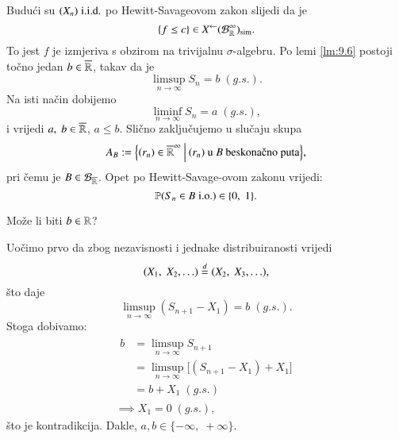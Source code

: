\begin{pr}
    Budu\' ci su $(X_n) \; \mathrm{i.i.d.}$ po Hewitt-Savageovom zakon slijedi da je
    \begin{equation*}
        \{f \leq c\} \in {X}^{\leftarrow} (\mathcal{B}_{\mathbb{R}}^\infty)_{\mathrm{sim}}.
    \end{equation*}
    To jest $f$ je izmjeriva s obzirom na trivijalnu $\sigma$-algebru.
    Po lemi \ref{lm:9.6} postoji to\v cno jedan $b \in \overline{\mathbb{R}}$, takav da je
    \begin{equation*}
        \limsup\limits_{n \to \infty} S_n = b \; (g.s.).
    \end{equation*}
    Na isti na\v cin dobijemo
    \begin{equation*}
        \liminf\limits_{n \to \infty} S_n = a \; (g.s.),
    \end{equation*}
    i vrijedi $a, \; b \in \overline{\mathbb{R}}$, $a \leq b$.
    Sli\v cno zaklju\v cujemo u slu\v caju skupa
    \begin{equation*}
        A_B := \bigSkup{(r_n) \in \extReal^\infty}{(r_n) \textnormal{ u $B$ beskona\v cno puta}},
    \end{equation*}
    pri \v cemu je $B \in \mathcal{B}_{\overline{\mathbb{R}}}$.
    Opet po Hewitt-Savage-ovom zakonu vrijedi:
    \begin{equation*}
        \mathbb{P}({S_n \in B \; \mathrm{i.o.}}) \in \{0, \; 1\}.
    \end{equation*}

    Mo\v ze li biti $b \in \mathbb{R}$?

    Uo\v cimo prvo da zbog nezavisnosti i jednake distribuiranosti vrijedi
    \begin{equation*}
        (X_1, \; X_2, \ldots) \overset{d}{=} (X_2, \; X_3, \ldots),
    \end{equation*}
    \v sto daje 
    \begin{equation*}
        \limsup\limits_{n \to \infty} (S_{n + 1} - X_1) = b \; (g.s.).
    \end{equation*}
    Stoga dobivamo:
    \begin{equation*}
        \begin{gathered}
            \begin{aligned}
                b &= \limsup\limits_{n \to \infty} S_{n + 1}\\
                &= \limsup\limits_{n \to \infty} \big[ (S_{n + 1} - X_1) + X_1 \big]\\
                &= b + X_1 \; (g.s.)
            \end{aligned}\\
            \implies X_1 = 0 \; (g.s.),
        \end{gathered}
    \end{equation*}
    \v sto je kontradikcija.
    Dakle, $a, b \in \{-\infty, \; +\infty\}$.


\end{pr}
